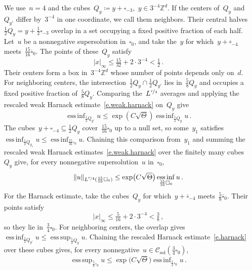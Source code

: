 \documentclass[11pt,letterpaper]{article}
\numberwithin{equation}{section}
\theoremstyle{definition}
\newcommand{\Zd}{\mathbb{Z}^d}
\newcommand{\nf}{\nicefrac}
\newcommand{\cu}{\square}
\DeclareMathOperator*{\esssup}{ess\,sup}
\DeclareMathOperator*{\essinf}{ess\,inf}
\DeclarePairedDelimiter{\norm}{\lVert}{\rVert}
\newcommand{\Csol}{\mathcal C_{\mathrm{sol}}}
\begin{document}
We use~$n=4$ and the cubes~$Q_y\coloneqq y+\cu_{-3}$,~$y\in3^{-4}\Zd$. If the centers of~$Q_y$ and~$Q_{y'}$ differ by~$3^{-4}$ in one coordinate, we call them neighbors. Their central halves~$\frac12Q_y=y+\frac12\cu_{-3}$ overlap in a set occupying a fixed positive fraction of each half. Let~$u$ be a nonnegative supersolution in~$\cu_0$, and take the~$y$ for which~$y+\overline{\cu}_{-4}$ meets~$\frac{15}{16}\overline{\cu}_0$. The points of these~$Q_y$ satisfy
\begin{equation*}
	|x|_\infty\leq\tfrac{15}{32}+2\cdot3^{-4}<\tfrac12\,.
\end{equation*}
Their centers form a box in~$3^{-4}\Zd$ whose number of points depends only on~$d$. For neighboring centers, the intersection~$\frac12Q_y\cap\frac12Q_{y'}$ lies in~$\frac58Q_y$ and occupies a fixed positive fraction of~$\frac58Q_y$. Comparing the~$L^{\nf r4}$ averages and applying the rescaled weak Harnack estimate~\eqref{e.weak.harnack} on~$Q_y$ give
\begin{equation*}
	\essinf_{\frac12Q_{y'}}u\leq\exp(C\sqrt\Theta)\essinf_{\frac12Q_y}u\,.
\end{equation*} The cubes~$y+\cu_{-4}\subseteq\frac12Q_y$ cover~$\frac{15}{16}\cu_0$ up to a null set, so some~$y_1$ satisfies~$\essinf_{\frac12Q_{y_1}}u\leq\essinf_{\frac{15}{16}\cu_0}u$. Chaining this comparison from~$y_1$ and summing the rescaled weak Harnack estimates~\eqref{e.weak.harnack} over the finitely many cubes~$Q_y$ give, for every nonnegative supersolution~$u$ in~$\cu_0$,
\begin{equation}
	\norm{u}_{L^{\nf r4}(\frac{15}{16}\cu_0)}\leq\exp\bigl(C\sqrt\Theta\bigr)\essinf_{\frac{15}{16}\cu_0}u\,.
	\label{e.interior.weak.harnack}
\end{equation}
For the Harnack estimate, take the cubes~$Q_y$ for which~$y+\overline{\cu}_{-4}$ meets~$\frac58\overline{\cu}_0$. Their points satisfy
\begin{equation*}
	|x|_\infty\leq\tfrac5{16}+2\cdot3^{-4}<\tfrac38\,,
\end{equation*}
so they lie in~$\frac34\cu_0$. For neighboring centers, the overlap gives~$\essinf_{\frac12Q_{y'}}u\leq\esssup_{\frac12Q_y}u$. Chaining the rescaled Harnack estimate~\eqref{e.harnack} over these cubes gives, for every nonnegative~$u\in\Csol(\frac34\cu_0)$,
\begin{equation}
	\esssup_{\frac58\cu_0}u\leq\exp\bigl(C\sqrt\Theta\bigr)\essinf_{\frac12\cu_0}u\,.
	\label{e.interior.harnack}
\end{equation}
\end{document}

